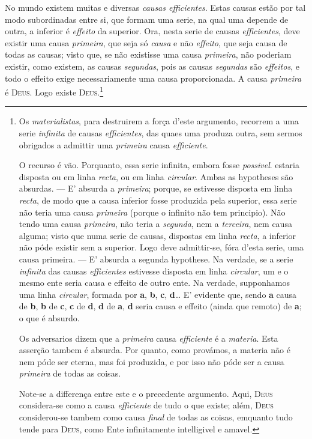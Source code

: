  No mundo existem muitas e diversas \emph{causas efficientes}. Estas causas
estão por tal modo subordinadas entre si, que formam uma serie, na qual uma depende de
outra, a inferior
 é \emph{effeito} da superior. Ora, nesta serie de causas \emph{efficientes},
deve existir uma causa \emph{primeira}, que seja só \emph{causa} e não \emph{effeito},
que seja causa de todas as causas; visto que, se não existisse uma
 causa \emph{primeira}, não poderiam existir, como existem, as causas
\emph{segundas}, pois as causas \emph{segundas} são \emph{effeitos}, e todo o effeito
 exige necessariamente uma causa proporcionada. A causa \emph{primeira} é
\textsc{Deus}. Logo existe \textsc{Deus}.\footnote{Os \emph{materialistas}, para destruirem a força d'este argumento, recorrem a uma serie
\emph{infinita} de causas \emph{efficientes}, das quaes uma produza outra, sem sermos
obrigados a admittir uma \emph{primeira} causa \emph{efficiente}.

O recurso é vão. Porquanto, essa serie infinita, embora fosse \emph{possivel}. estaria
disposta ou em linha \emph{recta}, ou em linha \emph{circular}. Ambas as hypotheses são
absurdas. --- E' absurda a \emph{primeira}; porque, se estivesse disposta em linha
\emph{recta}, de modo que a causa inferior fosse produzida pela superior, essa serie não
teria uma causa \emph{primeira} (porque o infinito não tem principio). Não tendo uma
causa \emph{primeira}, não teria a \emph{segunda}, nem a \emph{terceira}, nem causa
alguma; visto que numa serie de causas, dispostas em linha \emph{recta}, a inferior não
póde existir sem a superior. Logo deve admittir-se, fóra d'esta serie, uma causa
primeira. --- E' absurda a segunda hypothese. Na verdade, se a serie \emph{infinita} das
causas \emph{efficientes} estivesse disposta em linha \emph{circular}, um e o mesmo ente
seria causa e effeito de outro ente. Na verdade, supponhamos uma linha \emph{circular},
formada por \textbf{a}, \textbf{b}, \textbf{c}, \textbf{d}\dots{} E' evidente que, sendo
\textbf{a} causa de \textbf{b}, \textbf{b} de \textbf{c}, \textbf{c} de \textbf{d},
\textbf{d} de \textbf{a}, \textbf{d} seria causa e effeito (ainda que remoto) de
\textbf{a}; o que é absurdo.

Os adversarios dizem que a \emph{primeira} causa \emph{efficiente} é a \emph{materia}.
Esta asserção tambem é absurda. Por quanto, como provámos, a materia não é nem póde ser
eterna, mas foi produzida, e por isso não póde ser a causa \emph{primeira} de todas as
coisas.

Note-se a differença entre este e o precedente argumento. Aqui, \textsc{Deus}
considera-se como a causa \emph{efficiente} de tudo o que existe; além, \textsc{Deus}
considerou-se tambem como causa \emph{final} de todas as coisas, emquanto tudo tende para
\textsc{Deus}, como Ente infinitamente intelligivel e amavel.}

